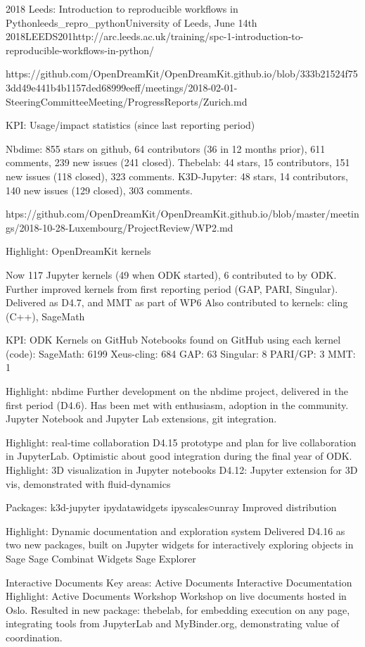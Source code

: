 \begin{Aim 1}
\begin{Aim 2}
\begin{event}{2018 Leeds: Introduction to reproducible workflows in Python}{leeds_repro_python}{University of Leeds, June 14th 
     2018}{LEEDS}{20}{1}{http://arc.leeds.ac.uk/training/spc-1-introduction-to-reproducible-workflows-in-python/}
\begin{itemize}
  https://github.com/OpenDreamKit/OpenDreamKit.github.io/blob/333b21524f753dd49e441b4b1157ded68999eeff/meetings/2018-02-01-SteeringCommitteeMeeting/ProgressReports/Zurich.md
  
  

KPI: Usage/impact statistics (since last reporting period)

Nbdime: 855 stars on github, 64 contributors (36 in 12 months prior), 611 
comments, 239 new issues (241 closed).
Thebelab: 44 stars, 15 contributors, 151 new issues (118 closed), 323 
comments.
K3D-Jupyter: 48 stars, 14 contributors, 140 new issues (129 closed), 303 
comments.

htps://github.com/OpenDreamKit/OpenDreamKit.github.io/blob/master/meetings/2018-10-28-Luxembourg/ProjectReview/WP2.md

Highlight: OpenDreamKit kernels

Now 117 Jupyter kernels (49 when ODK started), 6 contributed to by ODK.
Further improved kernels from first reporting period (GAP, PARI, Singular). 
Delivered as D4.7, and MMT as part of WP6
Also contributed to kernels: cling (C++), SageMath

KPI: ODK Kernels on GitHub
Notebooks found on GitHub using each kernel (code):
SageMath: 6199
Xeus-cling: 684
GAP: 63
Singular: 8
PARI/GP: 3
MMT: 1

Highlight: nbdime
Further development on the nbdime project, delivered in the first period (D4.6). Has been met with enthusiasm, adoption in the community.
Jupyter Notebook and Jupyter Lab extensions, git integration.

Highlight: real-time collaboration
D4.15 prototype and plan for live collaboration in JupyterLab. Optimistic about good integration during the final year of ODK.
Highlight: 3D visualization in Jupyter notebooks D4.12: Jupyter extension for 3D vis, demonstrated with fluid-dynamics

Packages:
k3d-jupyter
ipydatawidgets
ipyscales○unray
Improved distribution

Highlight: Dynamic documentation and exploration system
Delivered D4.16 as two new packages, built on Jupyter widgets for interactively exploring objects in Sage
Sage Combinat Widgets
Sage Explorer

Interactive Documents Key areas:
Active Documents
Interactive Documentation
Highlight: Active Documents Workshop
Workshop on live documents hosted in Oslo. Resulted in new package: 
thebelab, for embedding execution on any page, integrating tools from JupyterLab and MyBinder.org, demonstrating value of coordination.


\end{itemize}
\end{event}
\end{Aim 2}
\end{Aim 1}
